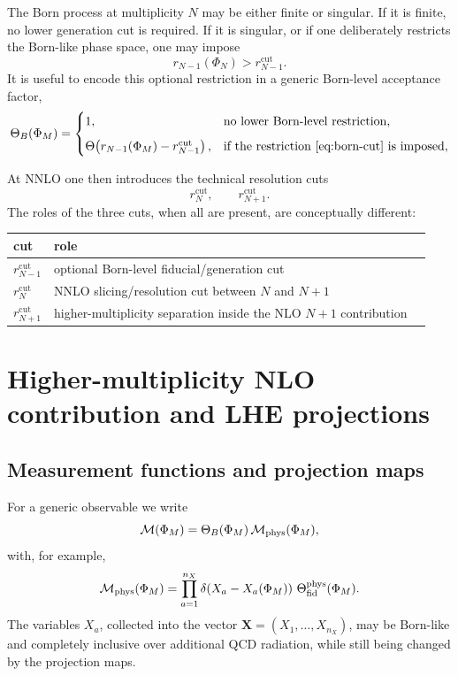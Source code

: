 \documentclass[11pt]{article}
\newcommand{\rnm}{r_{N-1}}
\newcommand{\rn}{r_N}
\newcommand{\rnp}{r_{N+1}}
\newcommand{\cut}{\mathrm{cut}}
\newcommand{\Ph}{\Phi}
\newcommand{\Mcal}{\mathcal{M}}
\newcommand{\ThetaB}{\Theta_B}
\begin{document}
The Born process at multiplicity \(N\) may be either finite or singular.
If it is finite, no lower generation cut is required.
If it is singular, or if one deliberately restricts the Born-like phase space, one may impose
\begin{equation}
\rnm(\Ph_N)>\rnm^{\cut}.
\label{eq:born-cut}
\end{equation}
It is useful to encode this optional restriction in a generic Born-level acceptance factor,
\begin{equation}
\ThetaB(\Ph_M)=
\begin{cases}
1, & \text{no lower Born-level restriction},\\[2mm]
\Theta\!\left(\rnm(\Ph_M)-\rnm^{\cut}\right),
& \text{if the restriction \eqref{eq:born-cut} is imposed},
\end{cases}
\label{eq:thetaB}
\end{equation}

At NNLO one then introduces the technical resolution cuts
\begin{equation}
\rn^{\cut},\qquad \rnp^{\cut}.
\label{eq:technical-cuts}
\end{equation}
The roles of the three cuts, when all are present, are conceptually different:
\begin{center}
\begin{tabular}{lll}
\toprule
cut & role \\
\midrule
\(\rnm^{\cut}\) & optional Born-level fiducial/generation cut \\
\(\rn^{\cut}\) & NNLO slicing/resolution cut between \(N\) and \(N+1\) \\
\(\rnp^{\cut}\) & higher-multiplicity separation inside the NLO \(N+1\) contribution \\
\bottomrule
\end{tabular}
\end{center}

\section{Higher-multiplicity NLO contribution and LHE projections}

\subsection{Measurement functions and projection maps}

For a generic observable we write
\begin{equation}
\Mcal(\Ph_M)
=
\ThetaB(\Ph_M)\,
\Mcal_{\rm phys}(\Ph_M),
\label{eq:measurement-full}
\end{equation}
with, for example,
\begin{equation}
\Mcal_{\rm phys}(\Ph_M)
=
\prod_{a=1}^{n_X}
\delta\!\left(X_a-X_a(\Ph_M)\right)
\,
\Theta_{\rm fid}^{\rm phys}(\Ph_M).
\label{eq:measurement-physical}
\end{equation}
The variables \(X_a\), collected into the vector
\(\mathbf X=(X_1,\ldots,X_{n_X})\), may be Born-like and completely inclusive over additional QCD radiation,
while still being changed by the projection maps.
\end{document}
